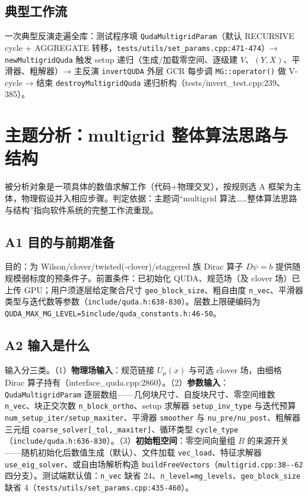 \documentclass[UTF8]{ctexart}
\begin{document}
\subsection{典型工作流}

一次典型反演走遍全库：测试程序填 \texttt{QudaMultigridParam}（默认 RECURSIVE cycle + AGGREGATE 转移，\textcolor{evidence}{\texttt{\nolinkurl{tests/utils/set_params.cpp:471-474}}}）→ \texttt{newMultigridQuda} 触发 setup 递归（生成/加载零空间、逐级建 $V$、$(Y,X)$、平滑器、粗解器）→ 主反演 \texttt{invertQUDA} 外层 GCR 每步调 \texttt{MG::operator()} 做 V-cycle → 结束 \texttt{destroyMultigridQuda} 递归析构（tests/invert\_test.cpp:239、385）。

\section{主题分析：multigrid 整体算法思路与结构}

被分析对象是一项具体的数值求解工作（代码+物理交叉），按规则选 A 框架为主体，物理假设并入相应步骤。判定依据：主题词``multigrid 算法……整体算法思路与结构''指向软件系统的完整工作流重现。

\subsection{A1 目的与前期准备}

目的：为 Wilson/clover/twisted(-clover)/staggered 族 Dirac 算子 $D\psi=b$ 提供随规模弱标度的预条件子。前置条件：已初始化 QUDA、规范场（及 clover 场）已上传 GPU；用户须逐层给定聚合尺寸 \texttt{geo\_block\_size}、粗自由度 \texttt{n\_vec}、平滑器类型与迭代数等参数（\texttt{\nolinkurl{include/quda.h:638-830}}）。层数上限硬编码为 \texttt{QUDA\_MAX\_MG\_LEVEL=5}\textcolor{evidence}{\texttt{\nolinkurl{include/quda_constants.h:46-50}}}。

\subsection{A2 输入是什么}

输入分三类。（1）\textbf{物理场输入}：规范链接 $U_\mu(x)$ 与可选 clover 场，由细格 Dirac 算子持有（interface\_quda.cpp:2860）。（2）\textbf{参数输入}：\texttt{QudaMultigridParam} 逐层数组——几何块尺寸、自旋块尺寸、零空间维数 \texttt{n\_vec}、块正交次数 \texttt{n\_block\_ortho}、setup 求解器 \texttt{setup\_inv\_type} 与迭代预算 \texttt{num\_setup\_iter/setup\_maxiter}、平滑器 \texttt{smoother} 与 \texttt{nu\_pre/nu\_post}、粗解器三元组 \texttt{coarse\_solver[\_tol,\_maxiter]}、循环类型 \texttt{cycle\_type}（\textcolor{evidence}{\texttt{\nolinkurl{include/quda.h:636-830}}}）。（3）\textbf{初始粗空间}：零空间向量组 $B$ 的来源开关——随机初始化后数值生成（默认）、文件加载 \texttt{vec\_load}、特征求解器 \texttt{use\_eig\_solver}、或自由场解析构造 \texttt{buildFreeVectors}（\textcolor{evidence}{\texttt{\nolinkurl{multigrid.cpp:38--62}}} 四分支）。测试端默认值：\texttt{n\_vec} 缺省 24、\texttt{n\_level=mg\_levels}、\texttt{geo\_block\_size} 缺省 4（\textcolor{evidence}{\texttt{\nolinkurl{tests/utils/set_params.cpp:435-460}}}）。
\end{document}
